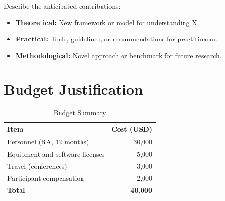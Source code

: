 \documentclass[11pt]{article}
\begin{document}
Describe the anticipated contributions:
\begin{itemize}
  \item \textbf{Theoretical:} New framework or model for understanding X.
  \item \textbf{Practical:} Tools, guidelines, or recommendations for practitioners.
  \item \textbf{Methodological:} Novel approach or benchmark for future research.
\end{itemize}

\section{Budget Justification}

\begin{table}[ht]
  \centering
  \caption{Budget Summary}
  \label{tab:budget}
  \begin{tabular}{lr}
    \toprule
    Item & Cost (USD) \\
    \midrule
    Personnel (RA, 12 months)       & 30,000 \\
    Equipment and software licenses & 5,000 \\
    Travel (conferences)            & 3,000 \\
    Participant compensation        & 2,000 \\
    \midrule
    \textbf{Total}                  & \textbf{40,000} \\
    \bottomrule
  \end{tabular}
\end{table}



\end{document}

